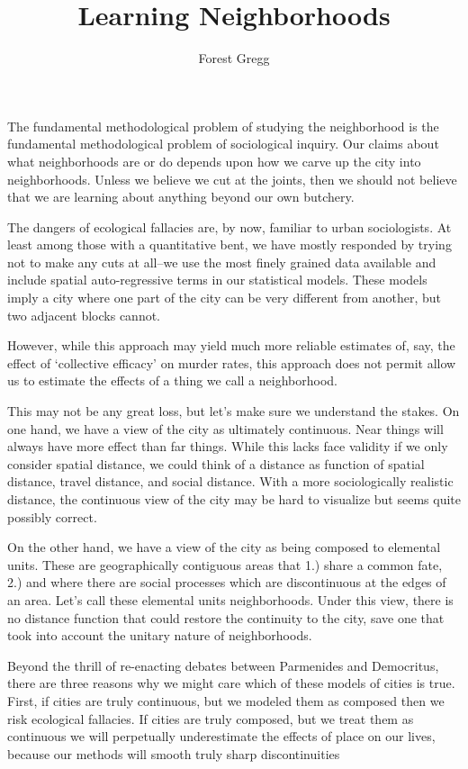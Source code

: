\documentclass{article}
\title{Learning Neighborhoods}
\author{Forest Gregg}
\begin{document}
\maketitle


The fundamental methodological problem of studying the neighborhood is
the fundamental methodological problem of sociological inquiry. Our
claims about what neighborhoods are or do depends upon how we carve up
the city into neighborhoods. Unless we believe we cut at the joints,
then we should not believe that we are learning about anything beyond
our own butchery.

The dangers of ecological fallacies are, by now, familiar to urban
sociologists. At least among those with a quantitative bent, we have
mostly responded by trying not to make any cuts at all--we use the
most finely grained data available and include spatial auto-regressive
terms in our statistical models. These models imply a city where one
part of the city can be very different from another, but two adjacent
blocks cannot.

However, while this approach may yield much more reliable estimates
of, say, the effect of `collective efficacy' on murder rates, this
approach does not permit allow us to estimate the effects of a thing
we call a neighborhood.

This may not be any great loss, but let's make sure we understand the
stakes. On one hand, we have a view of the city as ultimately
continuous. Near things will always have more effect than far
things. While this lacks face validity if we only consider spatial
distance, we could think of a distance as function of spatial
distance, travel distance, and social distance. With a more
sociologically realistic distance, the continuous view of the city may
be hard to visualize but seems quite possibly correct.

On the other hand, we have a view of the city as being composed to
elemental units. These are geographically contiguous areas that 1.)
share a common fate, 2.) and where there are social processes which
are discontinuous at the edges of an area. Let's call these elemental
units neighborhoods. Under this view, there is no distance function
that could restore the continuity to the city, save one that took into
account the unitary nature of neighborhoods.

Beyond the thrill of re-enacting debates between Parmenides and
Democritus, there are three reasons why we might care which of these
models of cities is true. First, if cities are truly continuous, but
we modeled them as composed then we risk ecological fallacies. If
cities are truly composed, but we treat them as continuous we will
perpetually underestimate the effects of place on our lives, because
our methods will smooth truly sharp discontinuities
\end{document}
